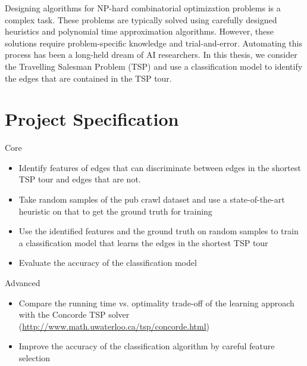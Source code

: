 \documentclass[]{UCD_CS_FYP_Report}
\begin{document}
\maketitle


\tableofcontents


\abstract
Designing algorithms for NP-hard combinatorial optimization problems is a complex task. These problems are typically solved using carefully designed heuristics and polynomial time approximation algorithms. However, these solutions require problem-specific knowledge and trial-and-error. Automating this process has been a long-held dream of AI researchers. In this thesis, we consider the Travelling Salesman Problem (TSP) and use a classification model to identify the edges that are contained in the TSP tour. 


\chapter{Project Specification}
\LARGE Core
\normalsize
\begin{itemize}
    \item Identify features of edges that can discriminate between edges in the shortest TSP tour and edges that are not.
    \item Take random samples of the pub crawl dataset and use a state-of-the-art heuristic on that to get the ground truth for training
    \item Use the identified features and the ground truth on random samples to train a classification model that learns the edges in the shortest TSP tour
    \item Evaluate the accuracy of the classification model
\end{itemize}
\LARGE Advanced
\normalsize
\begin{itemize}
    \item Compare the running time vs. optimality trade-off of the learning approach with the Concorde TSP solver (\url{http://www.math.uwaterloo.ca/tsp/concorde.html})
    \item Improve the accuracy of the classification algorithm by careful feature selection
\end{itemize}


\end{document}

